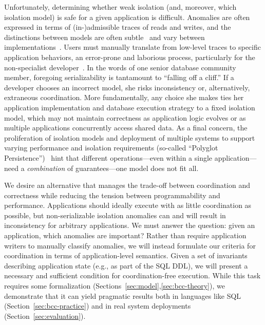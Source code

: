 Unfortunately, determining whether weak isolation (and, moreover,
which isolation model) is safe for a given application is
difficult. Anomalies are often expressed in terms of (in-)admissible
traces of reads and writes, and the distinctions between models are
often subtle~\cite{adya-isolation,isolation-semantics} and vary
between implementations~\cite{hat-vldb}. Users must manually translate
from low-level traces to specific application behaviors, an
error-prone and laborious process, particularly for the non-specialist
developer~\cite{consistency-borders}. In the words of one senior
database community member, foregoing serializability is tantamount to
``falling off a cliff.'' If a developer chooses an incorrect model,
she risks inconsistency or, alternatively, extraneous
coordination. More fundamentally, any choice she makes ties her
application implementation and database execution strategy to a fixed
isolation model, which may not maintain correctness as application
logic evolves or as multiple applications concurrently access shared
data. As a final concern, the proliferation of isolation models and
deployment of multiple systems to support varying performance and
isolation requirements (so-called ``Polyglot
Persistence'')~\cite{polyglot} hint that different operations---even
within a single application---need a \textit{combination} of
guarantees---one model does not fit all.



 We desire an alternative
that manages the trade-off between coordination and correctness while
reducing the tension between programmability and
performance. Applications should ideally execute with as little
coordination as possible, but non-serializable isolation anomalies can
and will result in inconsistency for arbitrary applications. We must
answer the question: given an application, which anomalies are
important? Rather than require application writers to manually
classify anomalies, we will instead formulate our criteria for
coordination in terms of application-level semantics. Given a set of
invariants describing application state (e.g., as part of the SQL
DDL), we will present a necessary and sufficient condition for
coordination-free execution. While this task requires some
formalization (Sections~\ref{sec:model},\ref{sec:bcc-theory}), we
demonstrate that it can yield pragmatic results both in languages like
SQL (Section~\ref{sec:bcc-practice}) and in real system deployments
(Section~\ref{sec:evaluation}).



